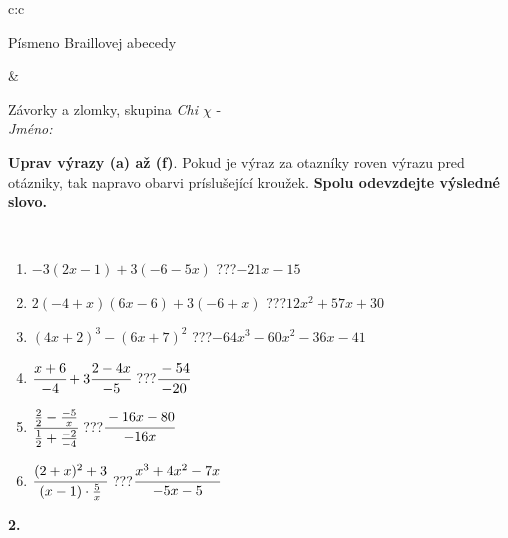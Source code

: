 \documentclass[10pt]{report}
\begin{document}
\begin{tabular}{c:c}
\begin{minipage}[c][104.5mm][t]{0.5\linewidth}
\begin{center}
\begin{minipage}{0.20\linewidth}
\begin{center}
{\small Písmeno Braillovej abecedy}
\end{center}
\end{minipage}
\end{center}
\end{minipage}
&
\begin{minipage}[c][104.5mm][t]{0.5\linewidth}
\begin{center}
\vspace{7mm}
{\huge Závorky a zlomky, skupina \textit{Chi $\chi$} -}\\[5mm]
\textit{Jméno:}\phantom{xxxxxxxxxxxxxxxxxxxxxxxxxxxxxxxxxxxxxxxxxxxxxxxxxxxxxxxxxxxxxxxxx}\\[5mm]
\begin{minipage}{0.95\linewidth}
\begin{center}
\textbf{Uprav výrazy (a) až (f)}. Pokud je výraz za otazníky roven výrazu pred otázniky, tak napravo obarvi príslušející kroužek. \textbf{Spolu odevzdejte výsledné slovo.}
\end{center}
\end{minipage}
\\[1mm]
\begin{minipage}{0.79\linewidth}
\begin{center}
\begin{varwidth}{\linewidth}
\begin{enumerate}
\normalsize
\item $-3(2x-1)+3(-6-5x)$\quad \dotfill\; ???\;\dotfill \quad $-21x-15$
\item $2(-4+x)(6x-6)+3(-6+x)$\quad \dotfill\; ???\;\dotfill \quad $12x^2+57x+30$
\item $(4x+2)^3-(6x+7)^2$\quad \dotfill\; ???\;\dotfill \quad $-64x^3-60x^2-36x-41$
\item $\cfrac{x+6}{-4}+3\cfrac{2-4x}{-5}$\quad \dotfill\; ???\;\dotfill \quad $\cfrac{-54}{-20}$
\item $\cfrac{\frac{2}{2}-\frac{-5}{x}}{\frac{1}{2}+\frac{-2}{-4}}$\quad \dotfill\; ???\;\dotfill \quad $\cfrac{-16x-80}{-16x}$
\item $\cfrac{(2+x)^2+3}{(x-1)\cdot\frac{5}{x}}$\quad \dotfill\; ???\;\dotfill \quad $\cfrac{x^3+4x^2-7x}{-5x-5}$
\end{enumerate}
\end{varwidth}
\end{center}
\end{minipage}
\begin{minipage}{0.20\linewidth}
\begin{center}
{\Huge\bfseries 2.} \\[2mm]

\end{center}
\end{minipage}
\end{center}
\end{minipage}
\end{tabular}
\end{document}
